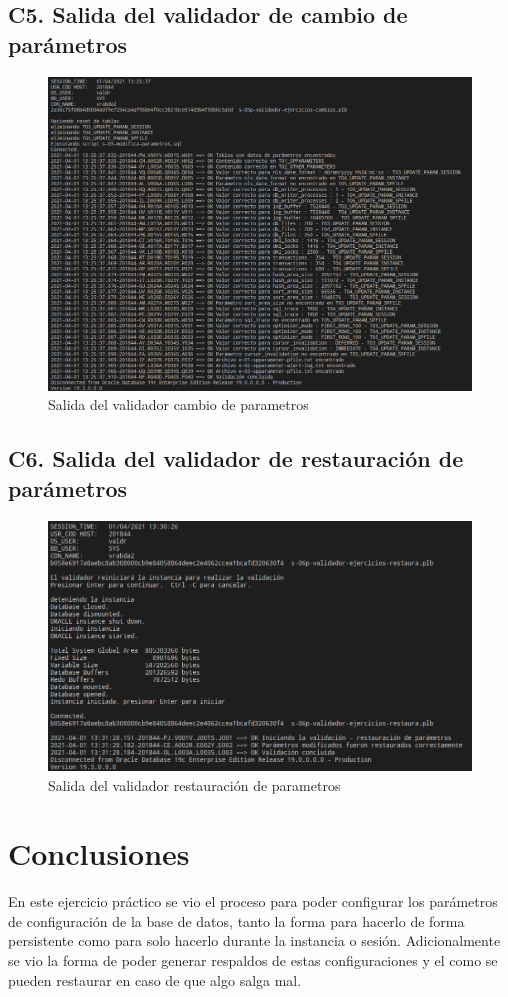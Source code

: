 \documentclass[journal]{IEEEtran}
\begin{document}
\subsection{C5. Salida del validador de cambio de parámetros}
\begin{figure}[H]
  \centering
  \includegraphics[scale=.21]{t020401.png}
   \caption{Salida del validador cambio de parametros}
   \label{fig:salidascript}
\end{figure}
\subsection{C6. Salida del validador de restauración de parámetros}
\begin{figure}[H]
  \centering
  \includegraphics[scale=.25]{t020402.png}
   \caption{Salida del validador restauración de parametros}
   \label{fig:salidascript}
\end{figure}

\section{Conclusiones}
En este ejercicio práctico se vio el proceso para poder configurar los parámetros 
de configuración de la base de datos, tanto la forma para hacerlo de forma persistente
como para solo hacerlo durante la instancia o sesión. Adicionalmente se vio la forma de 
poder generar respaldos de estas configuraciones y el como se pueden restaurar en caso de que 
algo salga mal.
\ifCLASSOPTIONcaptionsoff
  \newpage

\fi
\end{document}

